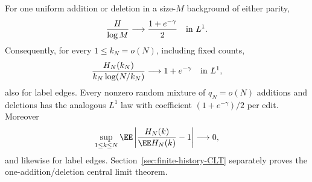 \documentclass[11pt,letterpaper]{article}
\begin{document}
\begin{theorem}
\label{thm:all-history-concentration}
For one uniform addition or deletion in a size-$M$ background of
either parity,
\begin{equation}\label{eq:one-history-LLN}
 \frac{H}{\log M}\longrightarrow\frac{1+e^{-\gamma}}2
                                      \quad\hbox{in }L^1.
\end{equation}
Consequently, for every $1\le k_N=o(N)$, including fixed counts,
\[
 \frac{H_N(k_N)}{k_N\log(N/k_N)}\longrightarrow1+e^{-\gamma}
                                      \quad\hbox{in }L^1,
\]
also for label edges. Every nonzero random mixture of
$q_N=o(N)$ additions and deletions has the analogous $L^1$ law
with coefficient $(1+e^{-\gamma})/2$ per edit.
Moreover
\begin{equation}\label{eq:uniform-relative-history-concentration}
 \sup_{1\le k\le N}
    \EE\left|\frac{H_N(k)}{\EE H_N(k)}-1\right|
       \longrightarrow0,
\end{equation}
and likewise for label edges. Section~\ref{sec:finite-history-CLT}
separately proves the one-addition/deletion central limit theorem.
\end{theorem}
\end{document}
